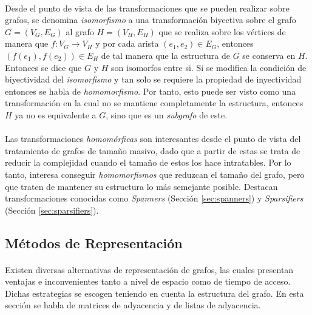 \documentclass{subfiles}
\begin{document}
      \paragraph{}
      Desde el punto de vista de las transformaciones que se pueden realizar sobre grafos, se denomina \emph{isomorfismo} a una transformación biyectiva sobre el grafo $G =(V_G, E_G)$ al grafo $H = (V_H, E_H)$ que se realiza sobre los vértices de manera que $f: V_G \rightarrow V_H$ y por cada arista $(e_1, e_2) \in E_G$, entonces $(f(e_1), f(e_2)) \in E_H$ de tal manera que la estructura de $G$ se conserva en $H$. Entonces se dice que $G$ y $H$ son isomorfos entre si. Si se modifica la condición de biyectividad del \emph{isomorfismo} y tan solo se requiere la propiedad de inyectividad entonces se habla de \emph{homomorfismo}. Por tanto, esto puede ser visto como una transformación en la cual no se mantiene completamente la estructura, entonces $H$ ya no es equivalente a $G$, sino que es un \emph{subgrafo} de este.

      \paragraph{}
      Las transformaciones \emph{homomórficas} son interesantes desde el punto de vista del tratamiento de grafos de tamaño masivo, dado que a partir de estas se trata de reducir la complejidad cuando el tamaño de estos los hace intratables. Por lo tanto, interesa conseguir \emph{homomorfismos} que reduzcan el tamaño del grafo, pero que traten de mantener su estructura lo más semejante posible. Destacan transformaciones conocidas como \emph{Spanners} (Sección \ref{sec:spanners}) y \emph{Sparsifiers} (Sección \ref{sec:sparsifiers}).

      \subsection{Métodos de Representación}
      \label{sec:laplacian_matrix}

        \paragraph{}
        Existen diversas alternativas de representación de grafos, las cuales presentan ventajas e inconvenientes tanto a nivel de espacio como de tiempo de acceso. Dichas estrategias se escogen teniendo en cuenta la estructura del grafo. En esta sección se habla de matrices de adyacencia y de listas de adyacencia.
\end{document}
